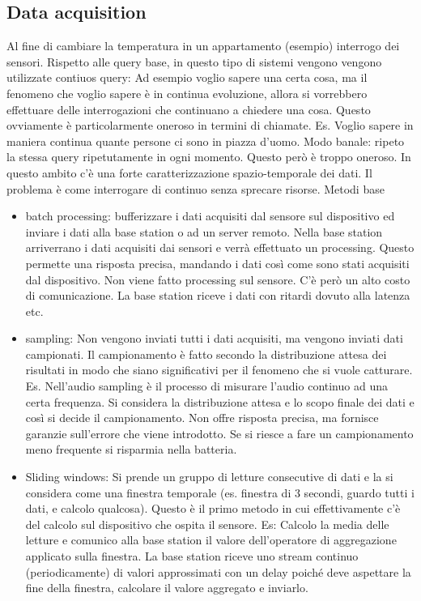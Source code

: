 \subsection{Data acquisition}
Al fine di cambiare la temperatura in un appartamento (esempio) interrogo dei sensori. Rispetto alle query base, in questo tipo di sistemi vengono vengono utilizzate contiuos query: Ad esempio voglio sapere una certa cosa, ma il fenomeno che voglio sapere è in continua evoluzione, allora si vorrebbero effettuare delle interrogazioni che continuano a chiedere una cosa. Questo ovviamente è particolarmente oneroso in termini di chiamate. Es. Voglio sapere in maniera continua quante persone ci sono in piazza d'uomo. Modo banale: ripeto la stessa query ripetutamente in ogni momento. Questo però è troppo oneroso.
In questo ambito c'è una forte caratterizzazione spazio-temporale dei dati. 
Il problema è come interrogare di continuo senza sprecare risorse.
Metodi base
\begin{itemize}
    \item batch processing: bufferizzare i dati acquisiti dal sensore sul dispositivo ed inviare i dati alla base station o ad un server remoto. Nella base station arriverrano i dati acquisiti dai sensori e verrà effettuato un processing. Questo permette una risposta precisa, mandando i dati così come sono stati acquisiti dal dispositivo. Non viene fatto processing sul sensore. C'è però un alto costo di comunicazione. La base station riceve i dati con ritardi dovuto alla latenza etc.
    \item sampling: Non vengono inviati tutti i dati acquisiti, ma vengono inviati dati campionati. Il campionamento è fatto secondo la distribuzione attesa dei risultati in modo che siano significativi per il fenomeno che si vuole catturare. Es. Nell'audio sampling è il processo di misurare l'audio continuo ad una certa frequenza. Si considera la distribuzione attesa e lo scopo finale dei dati e così si decide il campionamento. Non offre risposta precisa, ma fornisce garanzie sull'errore che viene introdotto. Se si riesce a fare un campionamento meno frequente si risparmia nella batteria.
    \item Sliding windows: Si prende un gruppo di letture consecutive di dati e la si considera come una finestra temporale (es. finestra di 3 secondi, guardo tutti i dati, e calcolo qualcosa). Questo è il primo metodo in cui effettivamente c'è del calcolo sul dispositivo che ospita il sensore. Es: Calcolo la media delle letture e comunico alla base station il valore dell'operatore di aggregazione applicato sulla finestra. La base station riceve uno stream continuo (periodicamente) di valori approssimati con un delay poiché deve aspettare la fine della finestra, calcolare il valore aggregato e inviarlo. 
   
\end{itemize}

